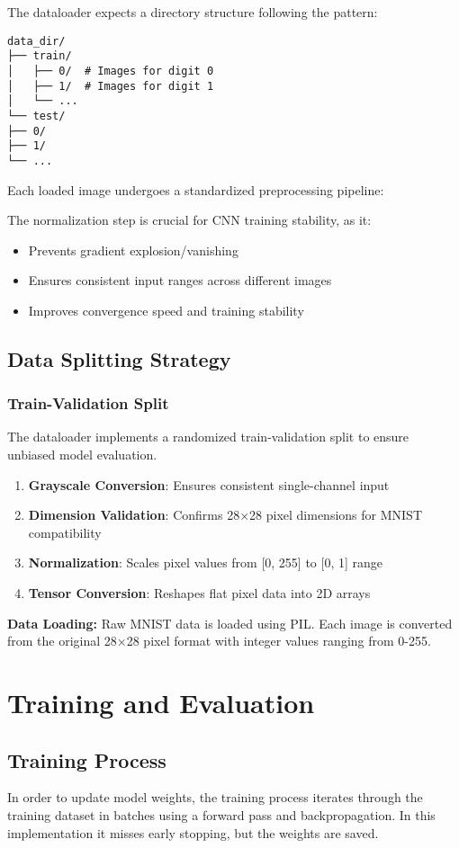 \documentclass[conference]{IEEEtran}
\begin{document}
The dataloader expects a directory structure following the pattern:
\begin{verbatim}
data_dir/
├── train/
│   ├── 0/  # Images for digit 0
│   ├── 1/  # Images for digit 1
│   └── ...
└── test/
├── 0/
├── 1/
└── ...
\end{verbatim}
Each loaded image undergoes a standardized preprocessing pipeline:

The normalization step is crucial for CNN training stability, as it:
\begin{itemize}
\item Prevents gradient explosion/vanishing
\item Ensures consistent input ranges across different images
\item Improves convergence speed and training stability
\end{itemize}

\subsection{Data Splitting Strategy}
\subsubsection{Train-Validation Split}
The dataloader implements a randomized train-validation split to ensure unbiased model evaluation.

\begin{enumerate}
\item \textbf{Grayscale Conversion}: Ensures consistent single-channel input
\item \textbf{Dimension Validation}: Confirms 28×28 pixel dimensions for MNIST compatibility
\item \textbf{Normalization}: Scales pixel values from [0, 255] to [0, 1] range
\item \textbf{Tensor Conversion}: Reshapes flat pixel data into 2D arrays
\end{enumerate}

\textbf{Data Loading:} Raw MNIST data is loaded using PIL. Each image is converted from the original 28×28 pixel format with integer values ranging from 0-255.

\section{Training and Evaluation}
\subsection{Training Process}
In order to update model weights, the training process iterates through the training dataset in batches using a forward pass and backpropagation. In this implementation it misses early stopping, but the weights are saved.
\end{document}
